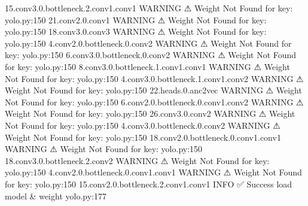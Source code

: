                              15.conv3.0.bottleneck.2.conv1.conv1                  
                    WARNING  ⚠ Weight Not Found for key:               yolo.py:150
                             21.conv2.0.conv1                                     
                    WARNING  ⚠ Weight Not Found for key:               yolo.py:150
                             18.conv3.0.conv3                                     
                    WARNING  ⚠ Weight Not Found for key:               yolo.py:150
                             4.conv2.0.bottleneck.0.conv2                         
                    WARNING  ⚠ Weight Not Found for key:               yolo.py:150
                             6.conv3.0.bottleneck.0.conv2                         
                    WARNING  ⚠ Weight Not Found for key:               yolo.py:150
                             8.conv3.0.bottleneck.1.conv1.conv1                   
                    WARNING  ⚠ Weight Not Found for key:               yolo.py:150
                             4.conv3.0.bottleneck.1.conv1.conv2                   
                    WARNING  ⚠ Weight Not Found for key:               yolo.py:150
                             22.heads.0.anc2vec                                   
                    WARNING  ⚠ Weight Not Found for key:               yolo.py:150
                             6.conv2.0.bottleneck.0.conv1.conv2                   
                    WARNING  ⚠ Weight Not Found for key:               yolo.py:150
                             26.conv3.0.conv2                                     
                    WARNING  ⚠ Weight Not Found for key:               yolo.py:150
                             4.conv3.0.bottleneck.0.conv2                         
                    WARNING  ⚠ Weight Not Found for key:               yolo.py:150
                             18.conv2.0.bottleneck.0.conv1.conv1                  
                    WARNING  ⚠ Weight Not Found for key:               yolo.py:150
                             18.conv3.0.bottleneck.2.conv2                        
                    WARNING  ⚠ Weight Not Found for key:               yolo.py:150
                             4.conv2.0.bottleneck.0.conv1.conv1                   
                    WARNING  ⚠ Weight Not Found for key:               yolo.py:150
                             15.conv2.0.bottleneck.2.conv1.conv1                  
                    INFO     ✅ Success load model & weight            yolo.py:177

